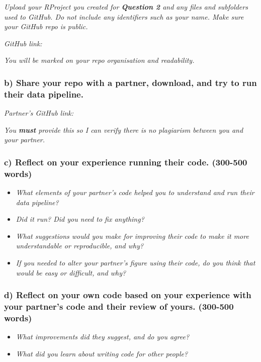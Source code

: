 \documentclass[
]{article}
\begin{document}
\emph{Upload your RProject you created for \textbf{Question 2} and any
files and subfolders used to GitHub. Do not include any identifiers such
as your name. Make sure your GitHub repo is public.}

\emph{GitHub link:}

\emph{You will be marked on your repo organisation and readability.}

\subsubsection{b) Share your repo with a partner, download, and try to
run their data
pipeline.}\label{b-share-your-repo-with-a-partner-download-and-try-to-run-their-data-pipeline.}

\emph{Partner's GitHub link:}

\emph{You \textbf{must} provide this so I can verify there is no
plagiarism between you and your partner.}

\subsubsection{c) Reflect on your experience running their code.
(300-500
words)}\label{c-reflect-on-your-experience-running-their-code.-300-500-words}

\begin{itemize}
\item
  \emph{What elements of your partner's code helped you to understand
  and run their data pipeline?}
\item
  \emph{Did it run? Did you need to fix anything?}
\item
  \emph{What suggestions would you make for improving their code to make
  it more understandable or reproducible, and why?}
\item
  \emph{If you needed to alter your partner's figure using their code,
  do you think that would be easy or difficult, and why?}
\end{itemize}

\subsubsection{d) Reflect on your own code based on your experience with
your partner's code and their review of yours. (300-500
words)}\label{d-reflect-on-your-own-code-based-on-your-experience-with-your-partners-code-and-their-review-of-yours.-300-500-words}

\begin{itemize}
\item
  \emph{What improvements did they suggest, and do you agree?}
\item
  \emph{What did you learn about writing code for other people?}
\end{itemize}
\end{document}
